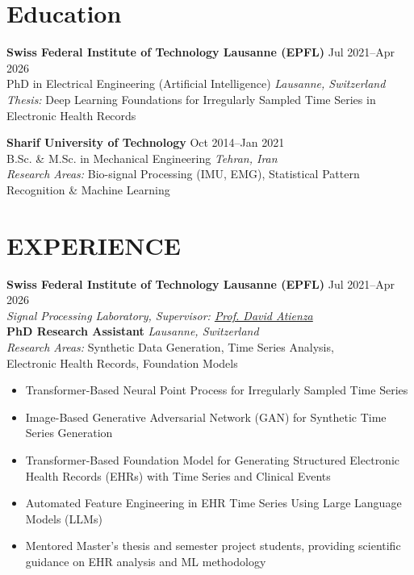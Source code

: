 \documentclass[10pt, letterpaper]{article}
\let\hrefWithoutArrow\href %
\renewcommand{\href}[2]{\hrefWithoutArrow{#1}{\ifthenelse{\equal{#2}{}}{ }{#2 }\raisebox{.15ex}{\footnotesize \faExternalLink*}}}
\begin{document}
\section{Education}

\textbf{Swiss Federal Institute of Technology Lausanne (EPFL)} \hfill Jul 2021--Apr 2026 \\
PhD in Electrical Engineering (Artificial Intelligence) \hfill \textit{Lausanne, Switzerland} \\
\textit{Thesis:} Deep Learning Foundations for Irregularly Sampled Time Series in Electronic Health Records
\vspace{0.5em}

\textbf{Sharif University of Technology} \hfill Oct 2014--Jan 2021 \\
B.Sc. \& M.Sc. in Mechanical Engineering \hfill \textit{Tehran, Iran}\\
\textit{Research Areas:} Bio-signal Processing (IMU, EMG), Statistical Pattern Recognition \& Machine Learning
\vspace{0.5em}

\section{EXPERIENCE}

\textbf{Swiss Federal Institute of Technology Lausanne (EPFL)} \hfill Jul 2021--Apr 2026 \\
\textit{Signal Processing Laboratory, Supervisor: \hrefWithoutArrow{https://people.epfl.ch/david.atienza}{Prof. David Atienza}} \\
\textbf{PhD Research Assistant} \hfill \textit{Lausanne, Switzerland}\\
\textit{Research Areas:} Synthetic Data Generation, Time Series Analysis,\\ Electronic Health Records, Foundation Models

\begin{itemize}
    \itemsep -3pt {}

    \item Transformer-Based Neural Point Process for Irregularly Sampled Time Series
    \item Image-Based Generative Adversarial Network (GAN) for Synthetic Time Series Generation
    \item Transformer-Based Foundation Model for Generating Structured Electronic Health Records (EHRs) with Time Series and Clinical Events
    \item Automated Feature Engineering in EHR Time Series Using Large Language Models (LLMs)
    \item Mentored Master's thesis and semester project students, providing scientific guidance on EHR analysis and ML methodology

\end{itemize}
\end{document}
